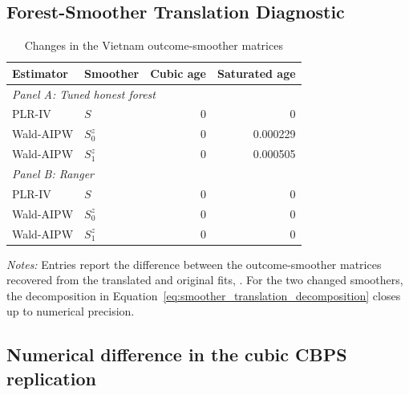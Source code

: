 \documentclass[12pt, a4paper, oneside]{article}
\theoremstyle{plain}
\theoremstyle{definition}
\begin{document}
\begin{samepage}
\subsection{Forest-Smoother Translation Diagnostic}
\label{subsec:vietnam_forest_smoother_diagnostic}

\begin{table}[H]
\centering
\caption{Changes in the Vietnam outcome-smoother matrices}
\label{tab:vietnam_forest_smoother_translation}
\footnotesize
\begin{threeparttable}
\begin{tabular}{@{}llrr@{}}
\toprule
Estimator
& Smoother
& Cubic age
& Saturated age \\
\midrule

\multicolumn{4}{l}{\textit{Panel A: Tuned honest forest}} \\[2pt]

PLR-IV
& \(S\)
& 0
& 0 \\

Wald-AIPW
& \(S_0^z\)
& 0
& 0.000229 \\

Wald-AIPW
& \(S_1^z\)
& 0
& 0.000505 \\[4pt]

\multicolumn{4}{l}{\textit{Panel B: Ranger}} \\[2pt]

PLR-IV
& \(S\)
& 0
& 0 \\

Wald-AIPW
& \(S_0^z\)
& 0
& 0 \\

Wald-AIPW
& \(S_1^z\)
& 0
& 0 \\

\bottomrule
\end{tabular}

\begin{tablenotes}
\footnotesize
\item \textit{Notes:} Entries report the 
difference between the outcome-smoother matrices recovered from the
translated and original fits, .
 For the two changed smoothers, the decomposition in
Equation~\eqref{eq:smoother_translation_decomposition} closes up to numerical
precision.
\end{tablenotes}
\end{threeparttable}
\end{table}
\end{samepage}


\subsection{Numerical difference in the cubic CBPS replication}
\label{subsubsec:vietnam_cbps_replication}
\end{document}
